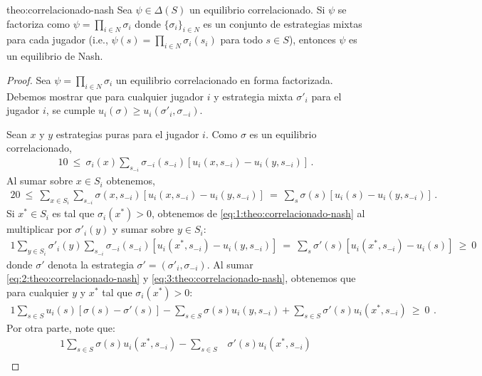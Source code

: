 \begin{reptheorem}{theo:correlacionado-nash}
Sea $\psi\in\Delta(S)$ un equilibrio correlacionado. Si $\psi$ se factoriza como $\psi=\prod_{i\in N} \sigma_i$ donde $\{\sigma_i\}_{i\in N}$ es un conjunto de estrategias mixtas para cada jugador (i.e., $\psi(s)=\prod_{i \in N} \sigma_i(s_i)$ para todo $s\in S$), entonces $\psi$ es un equilibrio de Nash.
\end{reptheorem}

\begin{proof}
Sea $\psi= \prod_{i \in N} \sigma_i$ un equilibrio correlacionado en forma factorizada. Debemos mostrar que para cualquier jugador $i$ y estrategia mixta $\sigma'_i$ para el jugador $i$, se cumple $u_i(\sigma) \geq u_i(\sigma'_i, \sigma_{-i})$.

Sean $x$ y $y$ estrategias puras para el jugador $i$.
Como $\sigma$ es un equilibrio correlacionado,
\begin{alignat}{1}
\label{eq:1:theo:correlacionado-nash}
0\ \leq\ \sigma_i(x) \sum_{s_{-i}} \sigma_{-i}(s_{-i})[u_i(x, s_{-i}) - u_i(y, s_{-i})] \,.
\end{alignat}
Al sumar sobre $x\in S_i$ obtenemos, 
\begin{alignat}{2}
\label{eq:2:theo:correlacionado-nash}
0\ \leq\ \sum_{x\in S_i} \sum_{s_{-i}} \sigma(x,s_{-i}) [u_i(x, s_{-i}) - u_i(y, s_{-i})]\ =\ \sum_s \sigma(s) [u_i(s) - u_i(y, s_{-i})] \,.
\end{alignat}
Si $x^* \in S_i$ es tal que $\sigma_i(x^*)>0$, obtenemos de \eqref{eq:1:theo:correlacionado-nash} al multiplicar por $\sigma'_i(y)$ y sumar sobre $y\in S_i$:
\begin{alignat}{1}
\label{eq:3:theo:correlacionado-nash}
\sum_{y \in S_i} \sigma'_i(y) \sum_{s_{-i}} \sigma_{-i} (s_{-i}) [u_i(x^*, s_{-i}) - u_i(y, s_{-i})]\ =\ \sum_{s} \sigma'(s) [u_i(x^*, s_{-i}) - u_i(s)]\ \geq\ 0
\end{alignat}
donde $\sigma'$ denota la estrategia $\sigma'=(\sigma'_i,\sigma_{-i})$. 
Al sumar \eqref{eq:2:theo:correlacionado-nash} y
\eqref{eq:3:theo:correlacionado-nash}, obtenemos que para cualquier $y$ y $x^*$ tal que $\sigma_i(x^*)>0$:
\begin{alignat}{1}
\label{eq:4:theo:correlacionado-nash}
\sum_{s \in S} u_i(s) [\sigma(s) - \sigma'(s)] - \sum_{s \in S} \sigma(s)u_i(y, s_{-i}) + \sum_{s \in S} \sigma'(s) u_i(x^*, s_{-i})\ \geq\ 0\ \,.
\end{alignat}
Por otra parte, note que:
\begin{alignat}{1}
  \sum_{s \in S} \sigma(s) u_i(x^*,s_{-i}) - \sum_{s \in S} &\sigma'(s) u_i(x^*,s_{-i}) \\

\end{alignat}
\end{proof}
